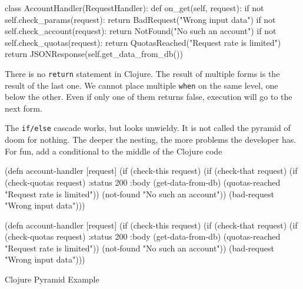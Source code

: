 \else

\begin{python}
class AccountHandler(RequestHandler):
  def on_get(self, request):
    if not self.check_params(request):
      return BadRequest("Wrong input data")
    if not self.check_account(request):
      return NotFound("No such an account")
    if not self.check_quotas(request):
      return QuotasReached("Request rate is limited")
    return JSONResponse(self.get_data_from_db())
\end{python}

\fi

There is no \verb|return| statement in Clojure. The result of multiple forms is the result of the last one. We cannot place multiple \verb|when| on the same level, one below the other. Even if only one of them returns false, execution will go to the next form.


The \verb|if/else| cascade works, but looks unwieldy. It is not called the pyramid of doom for nothing. The deeper the nesting, the more problems the developer has. For fun, add a conditional to the middle of the Clojure code 

\begin{listing}[ht!]

\ifx\DEVICETYPE\MOBILE

\begin{clojure}
(defn account-handler [request]
  (if (check-this request)
    (if (check-that request)
      (if (check-quotas request)
        {:status 200
         :body (get-data-from-db)}
        (quotas-reached
          "Request rate is limited"))
      (not-found "No such an account"))
    (bad-request "Wrong input data")))
\end{clojure}

\else

\begin{clojure}
(defn account-handler [request]
  (if (check-this request)
    (if (check-that request)
      (if (check-quotas request)
        {:status 200
         :body (get-data-from-db)}
        (quotas-reached "Request rate is limited"))
      (not-found "No such an account"))
    (bad-request "Wrong input data")))
\end{clojure}

\fi

\caption{Clojure Pyramid Example}
\label{fig:clj-pyramid}

\end{listing}

